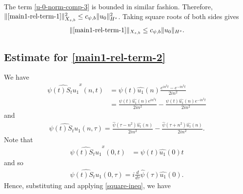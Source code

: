 \documentclass[12pt,reqno]{amsart}
\numberwithin{equation}{section}  %
\newcommand{\wh}{\widehat}
\begin{document}
%
%
The
term \eqref{u-0-norm-comp-3} is bounded in similar fashion. Therefore, 
$\|\eqref{main1-rel-term-1}\|_{X_{s,b}}^{2} \le c_{\psi, b}
\|u_{0}\|_{H^s}^2$. Taking square roots of both sides gives
%
%
\begin{equation}
  \begin{split}
    \|\eqref{main1-rel-term-1}\|_{X_{s,b}} \le c_{\psi, b}
    \|u_{0}\|_{H^s}.
  \end{split}
  \label{eqn:u-0-fin-est}
\end{equation}
%
%
%
%
\subsection{Estimate for \eqref{main1-rel-term-2}}
\label{ssec:est-init-term-2}
We have
%
%
\begin{equation*}
  \begin{split}
    \wh{\psi(t)S_{t}u_{1}}^{x}(n, t)
    & = \psi(t) \wh{u_{1}}(n) \frac{e^{in^2 t} - e^{-in^{2}t}}{2i n^{2}}
    \\
    & = \frac{\psi(t) \wh{u_{1}}(n)e^{in^{2}t}}{2i n^{2}} - \frac{\psi(t)
    \wh{u_{1}}(n)e^{-in^{2}t}}{2i n^{2}}  
  \end{split}
\end{equation*}
%
%
and
%
%
\begin{equation*}
  \begin{split}
    \wh{\psi(t) S_{t}u_{1}}(n, \tau) = \frac{\wh{\psi}(\tau -
    n^{2})\wh{u_{1}}(n)}{2i n^{2}} - \frac{\wh{\psi}(\tau + n^{2})\wh{u_{1}}(n)}{2i
    n^{2}}.
  \end{split}
\end{equation*}
%
Note that 
%
\begin{equation*}
  \begin{split}
    \wh{\psi(t)S_{t}u_{1}}^{x}(0, t)
    & = \psi(t) \wh{u_{1}}(0) t
      \end{split}
\end{equation*}
and so 
%
%
\begin{equation*}
  \begin{split}
    \wh{\psi(t) S_{t}u_{1}}(0, \tau) = i \frac{d}{d \tau} \wh{\psi}(\tau)
    \wh{u_{1}}(0).
  \end{split}
\end{equation*}
%
Hence, substituting and applying \eqref{square-ineq}, we have
%
%
\end{document}
